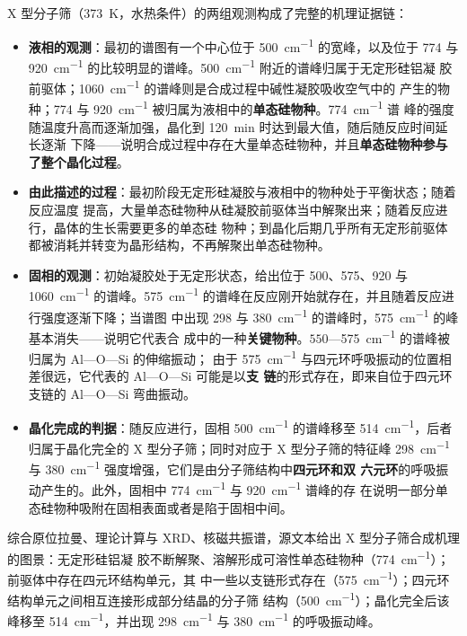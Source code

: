 X 型分子筛（\qty{373}{K}，水热条件）的两组观测构成了完整的机理证据链：
\begin{itemize}
\item \textbf{液相的观测}：最初的谱图有一个中心位于 \qty{500}{cm^{-1}} 的宽峰，以及位于 774
  与 \qty{920}{cm^{-1}} 的比较明显的谱峰。\qty{500}{cm^{-1}} 附近的谱峰归属于无定形硅铝凝
  胶前驱体；\qty{1060}{cm^{-1}} 的谱峰则是合成过程中碱性凝胶吸收空气中的  产生的物
  种；774 与 \qty{920}{cm^{-1}} 被归属为液相中的\textbf{单态硅物种}。\qty{774}{cm^{-1}} 谱
  峰的强度随温度升高而逐渐加强，晶化到 \qty{120}{min} 时达到最大值，随后随反应时间延长逐渐
  下降——说明合成过程中存在大量单态硅物种，并且\textbf{单态硅物种参与了整个晶化过程}。
\item \textbf{由此描述的过程}：最初阶段无定形硅凝胶与液相中的物种处于平衡状态；随着反应温度
  提高，大量单态硅物种从硅凝胶前驱体当中解聚出来；随着反应进行，晶体的生长需要更多的单态硅
  物种；到晶化后期几乎所有无定形前驱体都被消耗并转变为晶形结构，不再解聚出单态硅物种。
\item \textbf{固相的观测}：初始凝胶处于无定形状态，给出位于 500、575、920 与 \qty{1060}{cm^{-1}}
  的谱峰。\qty{575}{cm^{-1}} 的谱峰在反应刚开始就存在，并且随着反应进行强度逐渐下降；当谱图
  中出现 298 与 \qty{380}{cm^{-1}} 的谱峰时，\qty{575}{cm^{-1}} 的峰基本消失——说明它代表合
  成中的一种\textbf{关键物种}。$550$—\qty{575}{cm^{-1}} 的谱峰被归属为 Al—O—Si 的伸缩振动；
  由于 \qty{575}{cm^{-1}} 与四元环呼吸振动的位置相差很远，它代表的 Al—O—Si 可能是以\textbf{支
  链}的形式存在，即来自位于四元环支链的 Al—O—Si 弯曲振动。
\item \textbf{晶化完成的判据}：随反应进行，固相 \qty{500}{cm^{-1}} 的谱峰移至
  \qty{514}{cm^{-1}}，后者归属于晶化完全的 X 型分子筛；同时对应于 X 型分子筛的特征峰
  \qty{298}{cm^{-1}} 与 \qty{380}{cm^{-1}} 强度增强，它们是由分子筛结构中\textbf{四元环和双
  六元环}的呼吸振动产生的。此外，固相中 \qty{774}{cm^{-1}} 与 \qty{920}{cm^{-1}} 谱峰的存
  在说明一部分单态硅物种吸附在固相表面或者是陷于固相中间。
\end{itemize}
综合原位拉曼、理论计算与 XRD、核磁共振谱，源文本给出 X 型分子筛合成机理的图景：无定形硅铝凝
胶不断解聚、溶解形成可溶性单态硅物种（\qty{774}{cm^{-1}}）；前驱体中存在四元环结构单元，其
中一些以支链形式存在（\qty{575}{cm^{-1}}）；四元环结构单元之间相互连接形成部分结晶的分子筛
结构（\qty{500}{cm^{-1}}）；晶化完全后该峰移至 \qty{514}{cm^{-1}}，并出现 \qty{298}{cm^{-1}}
与 \qty{380}{cm^{-1}} 的呼吸振动峰。

